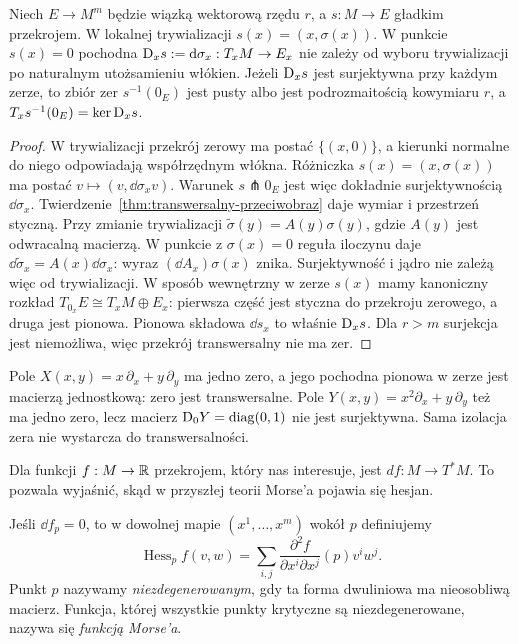 \begin{twierdzenie}
\label{thm:zera-przekroju}
Niech $E\to M^m$ będzie wiązką wektorową
rzędu $r$, a $s:M\to E$ gładkim przekrojem.
W lokalnej trywializacji $s(x)=(x,\sigma(x))$.
W punkcie $s(x)=0$ pochodna
$\mathrm D_xs:=\mathrm d\sigma_x:T_xM\to E_x$
nie zależy od wyboru trywializacji
po naturalnym utożsamieniu włókien.
Jeżeli $\mathrm D_xs$ jest surjektywna przy
każdym zerze, to zbiór zer $s^{-1}(0_E)$
jest pusty albo jest podrozmaitością kowymiaru $r$, a
$T_xs^{-1}(0_E)=\ker\mathrm D_xs$.
\end{twierdzenie}
\begin{proof}
W trywializacji przekrój zerowy ma postać
$\{(x,0)\}$, a kierunki normalne do niego
odpowiadają współrzędnym włókna.
Różniczka $s(x)=(x,\sigma(x))$ ma postać
$v\mapsto(v,\dd\sigma_xv)$. Warunek
$s\pitchfork 0_E$ jest więc dokładnie
surjektywnością $\dd\sigma_x$.
Twierdzenie~\ref{thm:transwersalny-przeciwobraz}
daje wymiar i przestrzeń styczną.
Przy zmianie trywializacji
$\widetilde\sigma(y)=A(y)\sigma(y)$,
gdzie $A(y)$ jest odwracalną macierzą.
W punkcie z $\sigma(x)=0$ reguła iloczynu
daje $\dd\widetilde\sigma_x=A(x)\dd\sigma_x$:
wyraz $(\dd A_x)\sigma(x)$ znika.
Surjektywność i jądro nie zależą więc
od trywializacji. W sposób wewnętrzny w zerze $s(x)$
mamy kanoniczny rozkład
$T_{0_x}E\cong T_xM\oplus E_x$: pierwsza część jest
styczna do przekroju zerowego, a druga jest pionowa.
Pionowa składowa $\dd s_x$ to właśnie $\mathrm D_xs$.
Dla $r>m$ surjekcja jest niemożliwa, więc przekrój
transwersalny nie ma zer.
\end{proof}

\begin{przyklad}
Pole $X(x,y)=x\,\partial_x+y\,\partial_y$ ma
jedno zero, a jego pochodna pionowa w zerze
jest macierzą jednostkową: zero jest
transwersalne. Pole
$Y(x,y)=x^2\partial_x+y\,\partial_y$
też ma jedno zero, lecz macierz
$\mathrm D_0Y=\operatorname{diag}(0,1)$
nie jest surjektywna. Sama izolacja zera
nie wystarcza do transwersalności.
\end{przyklad}

Dla funkcji $f:M\to\mathbb{R}$ przekrojem, który
nas interesuje, jest $df:M\to T^*M$.
To pozwala wyjaśnić, skąd w przyszłej
teorii Morse'a pojawia się hesjan.

\begin{definicja}
\label{def:morse-pochodna}
Jeśli $\dd f_p=0$, to w dowolnej mapie
$(x^1,\ldots,x^m)$ wokół $p$ definiujemy
\[
 \operatorname{Hess}_p f(v,w)
 =\sum_{i,j}
    \frac{\partial^2 f}{\partial x^i\partial x^j}(p)
                   v^iw^j.
\]
Punkt $p$ nazywamy \emph{niezdegenerowanym},
gdy ta forma dwuliniowa ma nieosobliwą macierz.
Funkcja, której wszystkie punkty krytyczne
są niezdegenerowane, nazywa się
\emph{funkcją Morse'a}.
\end{definicja}

